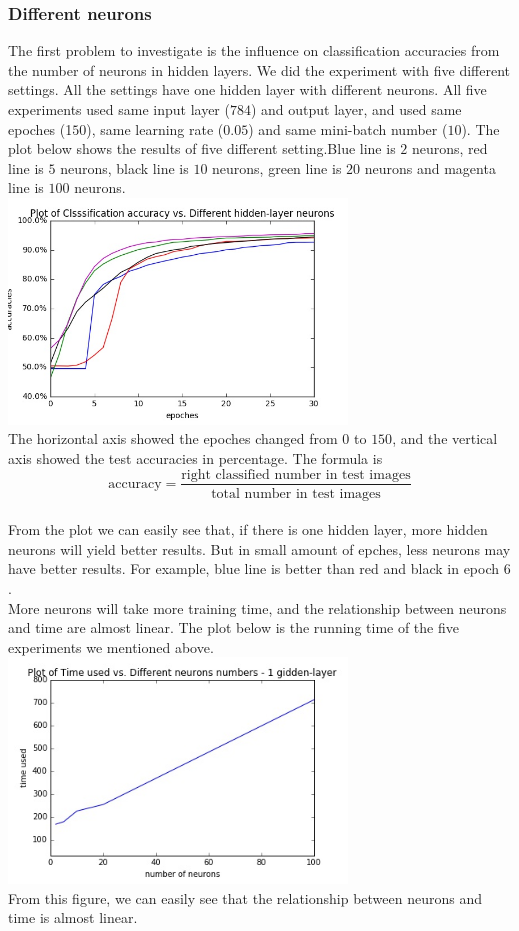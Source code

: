 \documentclass[12pt,a4paper]{article}
\begin{document}
\subsubsection{Different neurons}
The first problem to investigate is the influence on classification accuracies from the number of neurons in hidden layers. We did the experiment with five different settings. All the settings have one hidden layer with different neurons. All five experiments used same input layer ($784$) and output layer, and used same epoches (1$50$), same learning rate ($0.05$) and same mini-batch number ($10$). The plot below shows the results of five different setting.Blue line is $2$ neurons, red line is $5$ neurons, black line is $10$ neurons, green line is $20$ neurons and magenta line is $100$ neurons.\\
\includegraphics[width=90mm,scale=1]{p101.jpg}\\
The horizontal axis showed the epoches changed from $0$ to $150$, and the vertical axis showed the test accuracies in percentage. The formula is
\[\text{accuracy} = \frac{\text{right classified number in test images}}{ \text{total number in test images}}\]\\
From the plot we can easily see that, if there is one hidden layer, more hidden neurons will yield better results. But in small amount of epches, less neurons may have better results. For example, blue line is better than red and black in epoch $6$.\\
More neurons will take more training time, and the relationship between neurons and time are almost linear. The plot below is the running time of the five experiments we mentioned above.\\
\includegraphics[width=90mm,scale=1]{p102.jpg}\\
From this figure, we can easily see that the relationship between neurons and time is almost linear.
\end{document}
